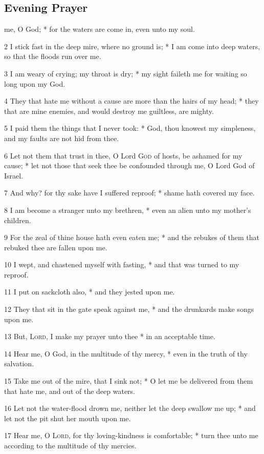 \subsection{Evening Prayer}
 me, O God; * for the waters are come in, even unto my soul.\par
2 I stick fast in the deep mire, where no ground is; * I am come into deep waters, so that the floods run over me.\par
3 I am weary of crying; my throat is dry; * my sight faileth me for waiting so long upon my God.\par
4 They that hate me without a cause are more than the hairs of my head; * they that are mine enemies, and would destroy me guiltless, are mighty.\par
5 I paid them the things that I never took: * God, thou knowest my simpleness, and my faults are not hid from thee.\par
6 Let not them that trust in thee, O Lord \textsc{God} of hosts, be ashamed for my cause; * let not those that seek thee be confounded through me, O Lord God of Israel.\par
7 And why? for thy sake have I suffered reproof; * shame hath covered my face.\par
8 I am become a stranger unto my brethren, * even an alien unto my mother's children.\par
9 For the zeal of thine house hath even eaten me; * and the rebukes of them that rebuked thee are fallen upon me.\par
10 I wept, and chastened myself with fasting, * and that was turned to my reproof.\par
11 I put on sackcloth also, * and they jested upon me.\par
12 They that sit in the gate speak against me, * and the drunkards make songs upon me.\par
13 But, {\textsc{Lord}}, I make my prayer unto thee * in an acceptable time.\par
14 Hear me, O God, in the multitude of thy mercy, * even in the truth of thy salvation.\par
15 Take me out of the mire, that I sink not; * O let me be delivered from them that hate me, and out of the deep waters.\par
16 Let not the water-flood drown me, neither let the deep swallow me up; * and let not the pit shut her mouth upon me.\par
17 Hear me, O {\textsc{Lord}}, for thy loving-kindness is comfortable; * turn thee unto me according to the multitude of thy mercies.\par
